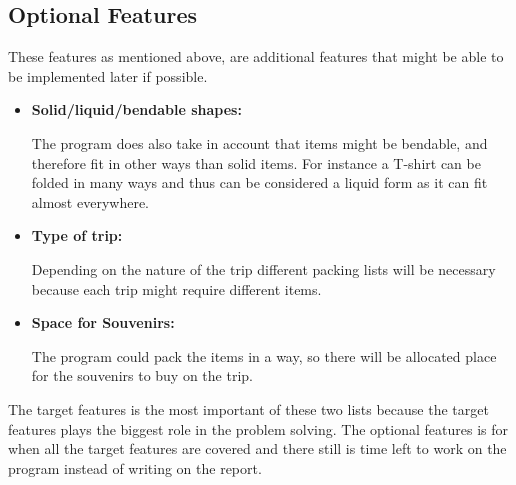 \subsection{Optional Features}
These features as mentioned above, are additional features that might be able to be implemented later if possible.\newline

\begin{itemize}
\item \textbf{Solid/liquid/bendable shapes:}

The program does also take in account that items might be bendable, and therefore fit in other ways than solid items. For instance a T-shirt can be folded in many ways and thus can be considered a liquid form as it can fit almost everywhere.

\item \textbf{Type of trip:}

Depending on the nature of the trip different packing lists will be necessary because each trip might require different items.

\item \textbf{Space for Souvenirs:}

The program could pack the items in a way, so there will be allocated place for the souvenirs to buy on the trip.
\end{itemize}

The target features is the most important of these two lists because the target features plays the biggest role in the problem solving. The optional features is for when all the target features are covered and there still is time left to work on the program instead of writing on the report.